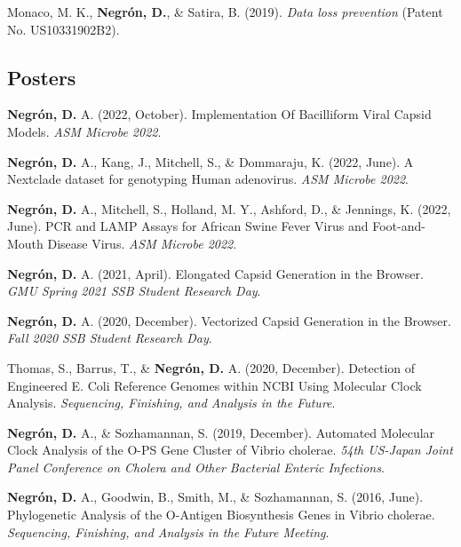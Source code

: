 \documentclass[11pt,a4paper,]{awesome-cv}
\begin{document}
\leavevmode{}%
Monaco, M. K., \textbf{Negrón, D.}, \& Satira, B. (2019). \emph{Data
loss prevention} (Patent No. US10331902B2).

\hypertarget{posters}{%
\subsection{Posters}\label{posters}}

\hypertarget{bibliography}{}
\leavevmode{}%
\textbf{Negrón, D.} A. (2022, October). Implementation Of Bacilliform
Viral Capsid Models. \emph{ASM Microbe 2022}.

\leavevmode{}%
\textbf{Negrón, D.} A., Kang, J., Mitchell, S., \& Dommaraju, K. (2022,
June). A Nextclade dataset for genotyping Human adenovirus. \emph{ASM
Microbe 2022}.

\leavevmode{}%
\textbf{Negrón, D.} A., Mitchell, S., Holland, M. Y., Ashford, D., \&
Jennings, K. (2022, June). PCR and LAMP Assays for African Swine Fever
Virus and Foot-and-Mouth Disease Virus. \emph{ASM Microbe 2022}.

\leavevmode{}%
\textbf{Negrón, D.} A. (2021, April). Elongated Capsid Generation in the
Browser. \emph{GMU Spring 2021 SSB Student Research Day}.

\leavevmode{}%
\textbf{Negrón, D.} A. (2020, December). Vectorized Capsid Generation in
the Browser. \emph{Fall 2020 SSB Student Research Day}.

\leavevmode{}%
Thomas, S., Barrus, T., \& \textbf{Negrón, D.} A. (2020, December).
Detection of Engineered E. Coli Reference Genomes within NCBI Using
Molecular Clock Analysis. \emph{Sequencing, Finishing, and Analysis in
the Future}.

\leavevmode{}%
\textbf{Negrón, D.} A., \& Sozhamannan, S. (2019, December). Automated
Molecular Clock Analysis of the O-PS Gene Cluster of Vibrio cholerae.
\emph{54th US-Japan Joint Panel Conference on Cholera and Other
Bacterial Enteric Infections}.

\leavevmode{}%
\textbf{Negrón, D.} A., Goodwin, B., Smith, M., \& Sozhamannan, S.
(2016, June). Phylogenetic Analysis of the O-Antigen Biosynthesis Genes
in Vibrio cholerae. \emph{Sequencing, Finishing, and Analysis in the
Future Meeting}.
\end{document}
